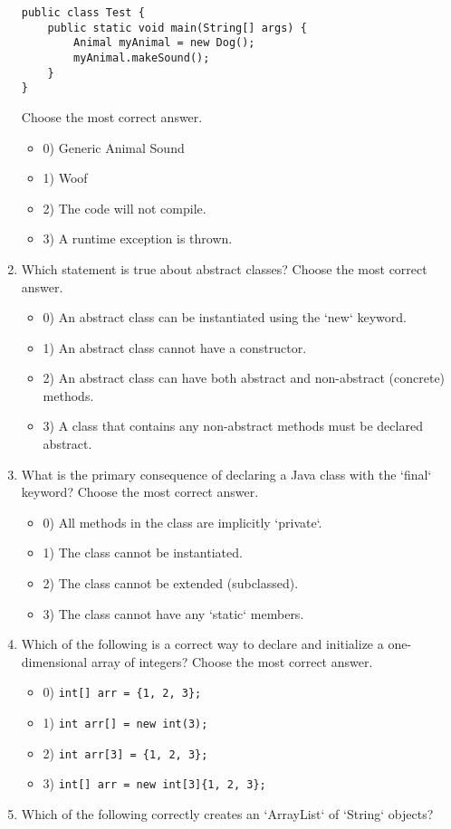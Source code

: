 \documentclass[12pt]{article}
\begin{document}
\begin{enumerate}[label=(\arabic*)]
\begin{verbatim}
public class Test {
    public static void main(String[] args) {
        Animal myAnimal = new Dog();
        myAnimal.makeSound();
    }
}
\end{verbatim}
Choose the most correct answer. 
\begin{itemize}
\item 0) Generic Animal Sound
\item 1) Woof
\item 2) The code will not compile.
\item 3) A runtime exception is thrown.
\end{itemize}
\item Which statement is true about abstract classes?
Choose the most correct answer. 
\begin{itemize}
\item 0) An abstract class can be instantiated using the `new` keyword.
\item 1) An abstract class cannot have a constructor.
\item 2) An abstract class can have both abstract and non-abstract (concrete) methods.
\item 3) A class that contains any non-abstract methods must be declared abstract.
\end{itemize}
\item What is the primary consequence of declaring a Java class with the `final` keyword?
Choose the most correct answer. 
\begin{itemize}
\item 0) All methods in the class are implicitly `private`.
\item 1) The class cannot be instantiated.
\item 2) The class cannot be extended (subclassed).
\item 3) The class cannot have any `static` members.
\end{itemize}
\item Which of the following is a correct way to declare and initialize a one-dimensional array of integers?
Choose the most correct answer. 
\begin{itemize}
\item 0) \verb|int[] arr = {1, 2, 3};|
\item 1) \verb|int arr[] = new int(3);|
\item 2) \verb|int arr[3] = {1, 2, 3};|
\item 3) \verb|int[] arr = new int[3]{1, 2, 3};|
\end{itemize}
\item Which of the following correctly creates an `ArrayList` of `String` objects?

\end{enumerate}
\end{document}
